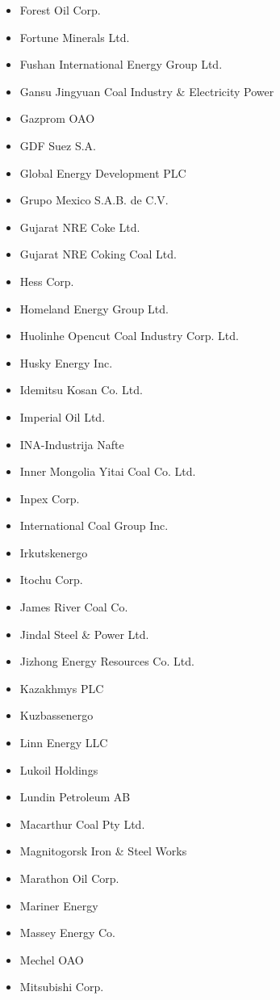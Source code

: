 \begin{itemize}
  \item Forest Oil Corp.
  \item Fortune Minerals Ltd.
  \item Fushan International Energy Group Ltd.
  \item Gansu Jingyuan Coal Industry \& Electricity Power 
  \item Gazprom OAO
  \item GDF Suez S.A.
  \item Global Energy Development PLC
  \item Grupo Mexico S.A.B. de C.V.
  \item Gujarat NRE Coke Ltd.
  \item Gujarat NRE Coking Coal Ltd.
  \item Hess Corp.
  \item Homeland Energy Group Ltd.
  \item Huolinhe Opencut Coal Industry Corp. Ltd.
  \item Husky Energy Inc.
  \item Idemitsu Kosan Co. Ltd.
  \item Imperial Oil Ltd.
  \item INA-Industrija Nafte
  \item Inner Mongolia Yitai Coal Co. Ltd.
  \item Inpex Corp.
  \item International Coal Group Inc.
  \item Irkutskenergo
  \item Itochu Corp.
  \item James River Coal Co.
  \item Jindal Steel \& Power Ltd.
  \item Jizhong Energy Resources Co. Ltd.
  \item Kazakhmys PLC
  \item Kuzbassenergo
  \item Linn Energy LLC
  \item Lukoil Holdings
  \item Lundin Petroleum AB
  \item Macarthur Coal Pty Ltd.
  \item Magnitogorsk Iron \& Steel Works
  \item Marathon Oil Corp.
  \item Mariner Energy
  \item Massey Energy Co.
  \item Mechel OAO
  \item Mitsubishi Corp.

\end{itemize}
